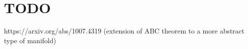 \section{TODO}
https://arxiv.org/abs/1007.4319 (extension of ABC theorem to a more abstract type of manifold)